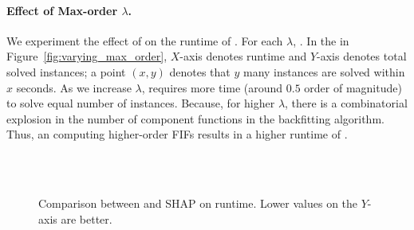 \paragraph{Effect of Max-order $ \lambda $.} We experiment the effect of  on the runtime of {\framework}. For each $ \lambda $, . In the  in  Figure~\ref{fig:varying_max_order}, $ X $-axis denotes runtime and $ Y $-axis denotes total solved instances; a point $ (x,y) $ denotes that $ y $ many instances are solved within $ x $ seconds. As we increase $ \lambda $, {\framework} requires more time (around $ 0.5 $ order of magnitude) to solve equal number of instances. Because, for higher $ \lambda $, there is a combinatorial explosion in the number of component functions in the backfitting algorithm. Thus, an computing higher-order FIFs results in a higher runtime of {\framework}.



\begin{comment}
TODO
\begin{itemize}
	\item all group fairness metrics
	\item vary sample size  and dimension of features (add statistics for each dataset in the figure)
	\item runtime vs max-order $ \lambda $
	\item draw $ 1/n $, $ 1/n^{1/2} $, $ 1/n^{1/3} $, std.
	\item \red{Experiment of fairness enhancing and attack algo on the same dataset.} 
\end{itemize}
\end{comment}





\clearpage


\begin{figure}
	\centering
	\\
	\\
	\caption{Comparison between {\framework} and SHAP on runtime. Lower values on the $ Y $-axis are better. }
\end{figure}





